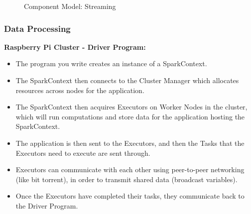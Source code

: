 \documentclass[12pt]{article} %
\begin{document}
		\begin{figure}[H] %
			\caption{Component Model: Streaming}
			\label{fig:speciation}
		\end{figure}
	
	\subsubsection{Data Processing}
	
	
	\textbf{Raspberry Pi Cluster - Driver Program:}
	
	\begin{itemize}
		\item The program you write creates an instance of a SparkContext.
		\item  The SparkContext then connects to the Cluster Manager which allocates resources across nodes for the application.
		\item The SparkContext then acquires Executors on Worker Nodes in the cluster, which will run computations and store data for the application hosting the SparkContext.
		\item The application is then sent to the Executors, and then the Tasks that the Executors need to execute are sent through.
		\item 	Executors can communicate with each other using peer-to-peer networking (like bit torrent), in order to transmit shared data (broadcast variables).
		\item Once the Executors have completed their tasks, they communicate back to the Driver Program.
		
	\end{itemize}	
	
\end{document}
